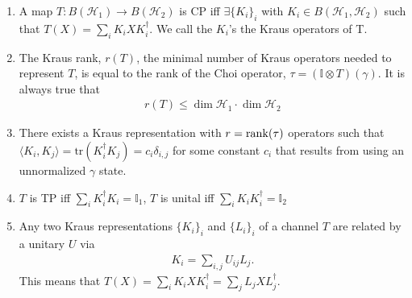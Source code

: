 \documentclass[../../note.tex]{subfiles}
\begin{document}
\begin{proposition}
\begin{enumerate}
    \item A map $T:B(\mathcal{H}_1)\rightarrow B(\mathcal{H}_2)$ is CP iff $\exists \{K_i\}_i$ with $K_i \in B(\mathcal{H}_1,\mathcal{H}_2)$ such that $T(X) = \sum_i K_i X K_i^{\dagger}$. We call the $K_i$'s the Kraus operators of T. 
    \item The Kraus rank, $r(T)$, the minimal number of Kraus operators needed to represent $T$, is equal to the rank of the Choi operator, $\tau = (\mathbb{I}\otimes T)(\gamma)$. It is always true that 
    \begin{align}
        r(T) \leq \dim\mathcal{H}_1\cdot\dim\mathcal{H}_2
    \end{align}
    \item There exists a Kraus representation with $r=\operatorname{rank}(\tau)$ operators such that $\langle K_i,K_j\rangle=\text{tr}(K_i^{\dagger} K_j) = c_i \delta_{i,j}$ for some constant $c_i$ that results from using an unnormalized $\gamma$ state. 
    \item $T$ is TP iff $\sum_i K_i^{\dagger}K_i = \mathbb{I}_1$, $T$ is unital iff $\sum_i K_i K_i^{\dagger} = \mathbb{I}_2$
    \item Any two Kraus representations $\{K_i\}_i$ and $\{L_i\}_i$ of a channel $T$ are related by a unitary $U$ via 
    \begin{align}
        K_i = \sum_{i,j} U_{ij}L_j.
    \end{align}
    This means that $T(X)=\sum_i K_i X K_i^{\dagger} = \sum_j L_j X L_j^{\dagger}$.
\end{enumerate}
\end{proposition}
\end{document}
